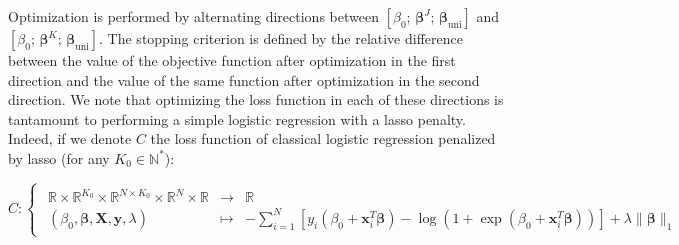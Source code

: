 \documentclass[10pt]{article}
\begin{document}
\noindent Optimization is performed by alternating directions between $\left[ \beta_0 ;\, \bm{\beta}^J  ; \,  \bm{\beta}_{\text{uni}}   \right]$ and  $\left[ \beta_0; \, \bm{\beta}^K  ;\, \bm{\beta}_{\text{uni}}  \right]$. The stopping criterion is defined by the relative difference between the value of the objective function after optimization in the first direction and the value of the same function after optimization in the second direction.  We note that optimizing the loss function in each of these directions is tantamount to performing a simple logistic regression with a lasso penalty. Indeed, if we denote $C$ the loss function of classical logistic regression penalized by lasso (for any $K_0 \in \mathbb{N}^{*}$):

\begin{equation}
    C: \begin{cases}
        \begin{array}{ccl}
            \mathbb{R} \times \mathbb{R}^{K_0} \times \mathbb{R}^{N \times K_0} \times \mathbb{R}^{N} \times \mathbb{R} & \longrightarrow & \mathbb{R}                                                                                                                                                                    \\
            (\beta_0, \bm{\beta}, \mathbf{X}, \mathbf{y}, \lambda )                                                     & \longmapsto     & -\displaystyle{\sum\limits_{i = 1}^N} [ y_i(\beta_0 + \mathbf{x}_i^T \bm{\beta}) - \log(1 + \exp(\beta_0 + \mathbf{x}_i^T \bm{\beta})) ] + \lambda \lVert \bm{\beta} \rVert_1
        \end{array}
    \end{cases}
\end{equation}
\end{document}
